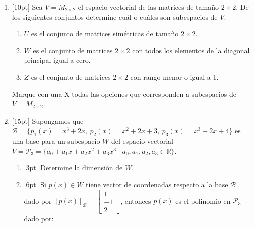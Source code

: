 \documentclass[11pt]{article}
\begin{document}
\begin{enumerate}
\item{}[10pt] Sea $V=M_{2\times 2}$ el espacio vectorial de las matrices de tamaño $2\times 2$. De los siguientes conjuntos determine cuál o cuáles son subespacios de $V$.
\begin{enumerate}
\item{} $U$ es el conjunto de matrices simétricas de tamaño $2\times 2$.
\item{} $W$ es el conjunto de matrices $2\times 2$ con todos los elementos de la diagonal principal igual a cero.
\item{} $Z$ es el conjunto de matrices $2\times 2$ con rango menor o igual a 1.
\end{enumerate}
\noindent Marque con una X todas las opciones que corresponden a subespacios de $V=M_{2\times 2}$.

\vspace{4pt}

\item{}[15pt] Supongamos que $\mathcal{B}=\{p_1(x)=x^3+2x,\ p_2(x)=x^2+2x+3,\ p_3(x)=x^3-2x+4\}$ es una base para un subespacio $W$ del espacio vectorial $V=\mathcal{P}_3=\{a_0+a_1x+a_2x^2+a_3x^3\mid a_0,a_1,a_2,a_3\in\mathbb{R}\}$.
\begin{enumerate}
\item{}[3pt] Determine la dimensión de $W$.

\vspace{4pt}

\item{}[6pt] Si $p(x)\in W$ tiene vector de coordenadas respecto a la base $\mathcal{B}$ dado por $[p(x)]_{\mathcal{B}}=\begin{bmatrix}1\\-1\\2\end{bmatrix}$, entonces $p(x)$ es el polinomio en $\mathcal{P}_3$ dado por:

\vspace{4pt}


\end{enumerate}
\end{enumerate}
\end{document}
